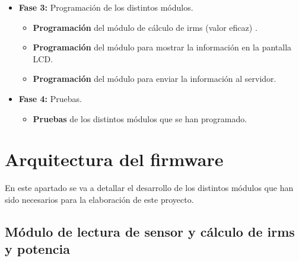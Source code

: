 \begin{itemize}
\begin{itemize}
	\end{itemize}
	\item\textbf{Fase 3: } Programación de los distintos módulos.
	\begin{itemize}
		\item\textbf{Programación}  del módulo de cálculo de irms (valor eficaz) \cite{valoreficaz}.
		\item\textbf{Programación}  del módulo para mostrar la información en la pantalla LCD.
		\item\textbf{Programación} del módulo para enviar la información al servidor.
	\end{itemize}
	\item\textbf{Fase 4: } Pruebas.
	\begin{itemize}
		\item\textbf{Pruebas}  de los distintos módulos que se han programado.
	\end{itemize}
	
\end{itemize}

\section{Arquitectura del firmware}

En este apartado se va a detallar el desarrollo de los distintos módulos que han sido necesarios para la elaboración de este proyecto.

\subsection{Módulo de lectura de sensor y cálculo de irms y potencia}

